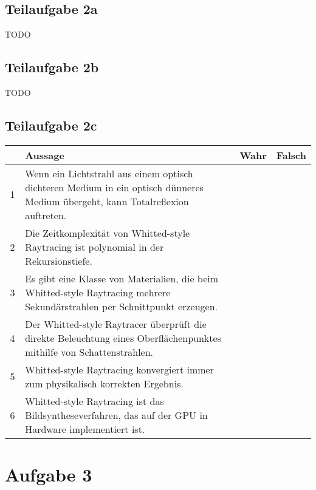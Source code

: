 \documentclass[a4paper]{scrartcl}
\begin{document}
\subsection*{Teilaufgabe 2a}
TODO

\subsection*{Teilaufgabe 2b}
TODO

\subsection*{Teilaufgabe 2c}
\begin{tabular}{cp{12cm}ll}\toprule
	~ & \textbf{Aussage} & \textbf{Wahr} & \textbf{Falsch} \\\midrule
	1 & Wenn ein Lichtstrahl aus einem optisch dichteren Medium in ein optisch dünneres Medium übergeht, kann Totalreflexion auftreten.
	  & \CheckedBox & \Square     \\
	2 & Die Zeitkomplexität von Whitted-style Raytracing ist polynomial in der Rekursionstiefe.
	  & \Square     & \CheckedBox \\
	3 & Es gibt eine Klasse von Materialien, die beim Whitted-style Raytracing mehrere Sekundärstrahlen per Schnittpunkt erzeugen.
	  & \CheckedBox & \Square     \\
	4 & Der Whitted-style Raytracer überprüft die direkte Beleuchtung eines Oberflächenpunktes mithilfe von Schattenstrahlen.
	  & \CheckedBox & \Square     \\
	5 & Whitted-style Raytracing konvergiert immer zum physikalisch korrekten Ergebnis.
	  & \Square     & \CheckedBox \\
	6 & Whitted-style Raytracing ist das Bildsyntheseverfahren, das auf der GPU in Hardware implementiert ist.
	  & \Square     & \CheckedBox \\\bottomrule
\end{tabular}

\section*{Aufgabe 3}
\end{document}
